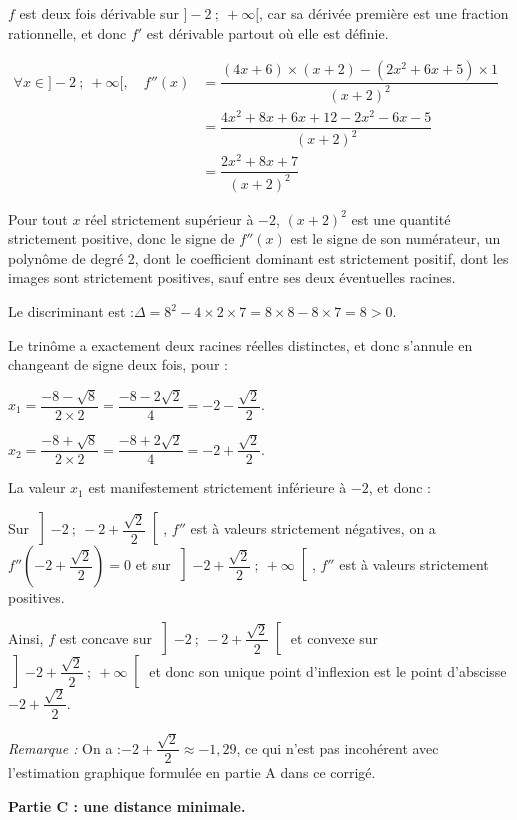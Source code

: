 \begin{enumerate}
$f$ est deux fois dérivable sur $]-2~;~+\infty[$, car sa dérivée première est une fraction rationnelle, et donc $f'$ est dérivable partout où elle est définie.

$\begin{aligned} \forall x \in ]-2~;~+\infty[,\quad f''(x) &= \dfrac{(4x + 6)\times (x+2) - (2x^2 + 6x + 5)\times 1}{(x+2)^2}\\
&=\dfrac{4x^2+8x+6x+12-2x^2-6x-5}{(x+2)^2}\\
&=\dfrac{2x^2 +8x +7}{(x+2)^2}
\end{aligned}$

Pour tout $x$ réel strictement supérieur à $-2$, $(x+2)^2$ est une quantité strictement positive, donc le signe de $f''(x)$ est le signe de son numérateur, un polynôme de degré 2, dont le coefficient dominant est strictement positif, dont les images sont strictement positives, sauf entre ses deux éventuelles racines.

Le discriminant est :\quad $\Delta = 8^2 - 4\times 2 \times 7 = 8\times 8- 8\times 7 = 8>0$.

Le trinôme a exactement deux racines réelles distinctes, et donc s'annule en changeant de signe deux fois, pour :

$x_1 = \dfrac{-8 - \sqrt{8}}{2\times 2} = \dfrac{-8 - 2\sqrt{2}}{4} = -2 - \dfrac{\sqrt{2}}{2}$.

$x_2 = \dfrac{-8 + \sqrt{8}}{2\times 2} = \dfrac{-8 + 2\sqrt{2}}{4} = -2 + \dfrac{\sqrt{2}}{2}$.

La valeur $x_1$ est manifestement strictement inférieure à $-2$, et donc :

Sur $ \left]-2~;~-2 + \dfrac{\sqrt{2}}{2}\right[ $, $f''$ est à valeurs strictement négatives, on a $f''\left(-2 + \dfrac{\sqrt{2}}{2}\right) =0$ et sur $\left]-2 + \dfrac{\sqrt{2}}{2}~;~+\infty\right[$, $f''$ est à valeurs strictement positives.

Ainsi, $f$ est concave sur $\left]-2~;~-2 + \dfrac{\sqrt{2}}{2}\right[$ et convexe sur $\left]-2 + \dfrac{\sqrt{2}}{2}~;~+\infty\right[$ et donc son unique point d'inflexion est le point d'abscisse $-2 + \dfrac{\sqrt{2}}{2}$.

\emph{Remarque :} On a :\quad$ -2 + \dfrac{\sqrt{2}}{2}\approx-1,29$, ce qui n'est pas incohérent avec l'estimation graphique formulée en partie A dans ce corrigé.

\end{enumerate}


\textbf{Partie C : une distance minimale.}

